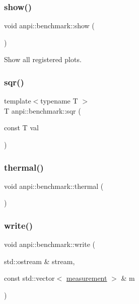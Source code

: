 \subsubsection{\texorpdfstring{show()}{show()}}
{\footnotesize\ttfamily void anpi\+::benchmark\+::show (\begin{DoxyParamCaption}{ }\end{DoxyParamCaption})}

Show all registered plots. \mbox{\label{namespaceanpi_1_1benchmark_ad4af8012fb125ce95037fbf5e5d003eb}} 
\subsubsection{\texorpdfstring{sqr()}{sqr()}}
{\footnotesize\ttfamily template$<$typename T $>$ \\
T anpi\+::benchmark\+::sqr (\begin{DoxyParamCaption}\item[{const T}]{val }\end{DoxyParamCaption})\hspace{0.3cm}{\ttfamily [inline]}}

\mbox{\label{namespaceanpi_1_1benchmark_a9835c451c061a81b48e64c5c055c3768}} 
\subsubsection{\texorpdfstring{thermal()}{thermal()}}
{\footnotesize\ttfamily void anpi\+::benchmark\+::thermal (\begin{DoxyParamCaption}{ }\end{DoxyParamCaption})}

\mbox{\label{namespaceanpi_1_1benchmark_acbe6f0f44f90b9b7861e08dc1e9231d3}} 
\subsubsection{\texorpdfstring{write()}{write()}\hspace{0.1cm}{\footnotesize\ttfamily [1/2]}}
{\footnotesize\ttfamily void anpi\+::benchmark\+::write (\begin{DoxyParamCaption}\item[{std\+::ostream \&}]{stream,  }\item[{const std\+::vector$<$ \hyperlink{structanpi_1_1benchmark_1_1measurement}{measurement} $>$ \&}]{m }\end{DoxyParamCaption})}


